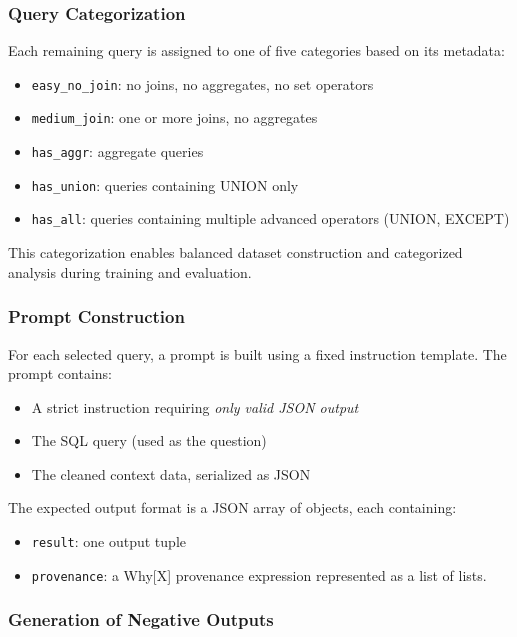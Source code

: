 \documentclass{article}
\begin{document}
\subsubsection{Query Categorization}

Each remaining query is assigned to one of five categories based on its metadata:

\begin{itemize}
    \item \texttt{easy\_no\_join}: no joins, no aggregates, no set operators
    \item \texttt{medium\_join}: one or more joins, no aggregates
    \item \texttt{has\_aggr}: aggregate queries
    \item \texttt{has\_union}: queries containing UNION only
    \item \texttt{has\_all}: queries containing multiple advanced operators (UNION, EXCEPT)
\end{itemize}

This categorization enables balanced dataset construction and categorized analysis during training and evaluation.

\subsubsection{Prompt Construction}

For each selected query, a prompt is built using a fixed instruction template. The prompt contains:

\begin{itemize}
    \item A strict instruction requiring \emph{only valid JSON output}
    \item The SQL query (used as the question)
    \item The cleaned context data, serialized as JSON
\end{itemize}

The expected output format is a JSON array of objects, each containing:
\begin{itemize}
    \item \texttt{result}: one output tuple
    \item \texttt{provenance}: a Why[X] provenance expression represented as a list of lists.
\end{itemize}

\subsubsection{Generation of Negative Outputs}
\end{document}

